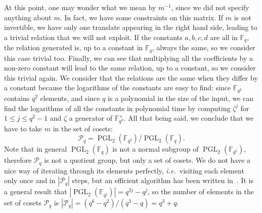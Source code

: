 \documentclass[a4paper,11pt]{article}
\theoremstyle{break}
\theoremstyle{sc}
\theoremstyle{definition}
\theoremstyle{remark}
\DeclareMathOperator{\pgl}{PGL}
\newcommand{\ie}{\emph{i.e.\ }}
\begin{document}
At this point, one may wonder what we mean by $m^{-1}$, since we
did not specify anything about $m$. In fact, we have some constraints on this
matrix. If $m$ is not invertible, we have only one translate appearing in the
right hand side, leading to a trivial relation that we will not exploit. If the
constants $a, b, c, d$ are all in $\mathbb{F}_q$, the relation generated is, up
to a constant in $\mathbb{F}_q$, always the same, so we consider this case
trivial too. Finally, we can see that multiplying all the coefficients by a
non-zero constant will lead to the same relation, up to a constant, so we
consider this trivial again. We consider that the relations are the same when
they differ by a constant because the logarithms of the constants are easy to
find: since $\mathbb{F}_{q^2}$ contains $q^2$ elements, and since $q$ is a
polynomial in the size of the input, we can find the logarithms of all the
constants in polynomial time by computing $\zeta^j$ for $1\leq j \leq q^2-1$ and
$\zeta$ a generator of $\mathbb{F}_{q^2}^\times$. All that being said, we conclude that we have to take
$m$ in the set of cosets:
\[
  \mathcal P_q = \pgl_2(\mathbb{F}_{q^2})/\pgl_2(\mathbb{F}_q).
\]
Note that in general $\pgl_2(\mathbb{F}_q)$ is not a normal subgroup of
$\pgl_2(\mathbb{F}_{q^2})$, therefore $\mathcal P_q$ is not a quotient group,
but only a set of cosets. We do not have a nice way of iterating
through its elements perfectly, \ie visiting each element only once and in
$|\mathcal P_q|$ steps, but an efficient algorithm has been written
in~\cite{ZC15}. It is a general result that
$|\pgl_2(\mathbb{F}_{q^j})|=q^{3j}-q^j$, so the number of elements in the set of
cosets $\mathcal P_q$ is $|\mathcal P_q| = (q^6-q^2)/(q^3-q)=q^3+q$.
\end{document}
